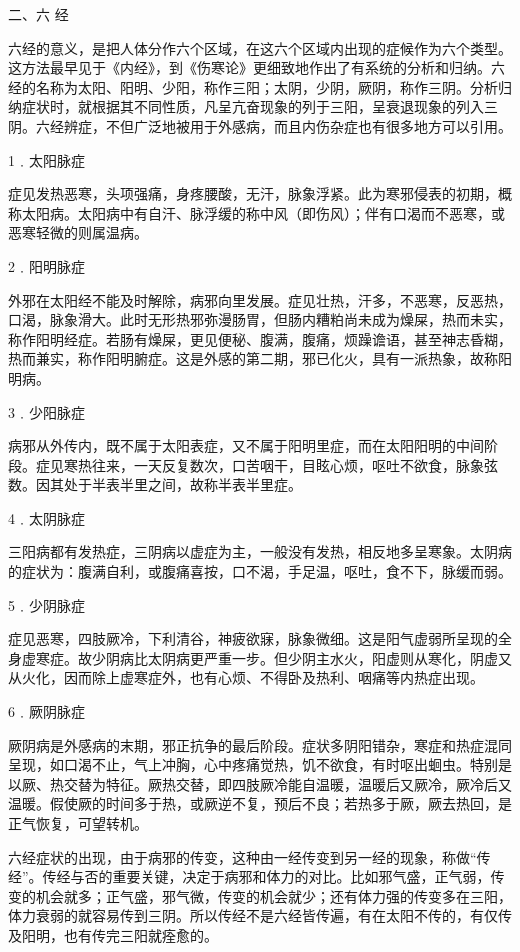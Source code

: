 \documentclass[12pt,UTF8]{ctexbook}
\begin{document}
二、六 经

六经的意义，是把人体分作六个区域，在这六个区域内出现的症候作为六个类型。这方法最早见于《内经》，到《伤寒论》更细致地作出了有系统的分析和归纳。六经的名称为太阳、阳明、少阳，称作三阳；太阴，少阴，厥阴，称作三阴。分析归纳症状时，就根据其不同性质，凡呈亢奋现象的列于三阳，呈衰退现象的列入三阴。六经辨症，不但广泛地被用于外感病，而且内伤杂症也有很多地方可以引用。

1﹒太阳脉症

症见发热恶寒，头项强痛，身疼腰酸，无汗，脉象浮紧。此为寒邪侵表的初期，概称太阳病。太阳病中有自汗、脉浮缓的称中风（即伤风）；伴有口渴而不恶寒，或恶寒轻微的则属温病。

2﹒阳明脉症

外邪在太阳经不能及时解除，病邪向里发展。症见壮热，汗多，不恶寒，反恶热，口渴，脉象滑大。此时无形热邪弥漫肠胃，但肠内糟粕尚未成为燥屎，热而未实，称作阳明经症。若肠有燥屎，更见便秘、腹满，腹痛，烦躁谵语，甚至神志昏糊，热而兼实，称作阳明腑症。这是外感的第二期，邪已化火，具有一派热象，故称阳明病。

3﹒少阳脉症

病邪从外传内，既不属于太阳表症，又不属于阳明里症，而在太阳阳明的中间阶段。症见寒热往来，一天反复数次，口苦咽干，目眩心烦，呕吐不欲食，脉象弦数。因其处于半表半里之间，故称半表半里症。

4﹒太阴脉症

三阳病都有发热症，三阴病以虚症为主，一般没有发热，相反地多呈寒象。太阴病的症状为：腹满自利，或腹痛喜按，口不渴，手足温，呕吐，食不下，脉缓而弱。

5﹒少阴脉症

症见恶寒，四肢厥冷，下利清谷，神疲欲寐，脉象微细。这是阳气虚弱所呈现的全身虚寒症。故少阴病比太阴病更严重一步。但少阴主水火，阳虚则从寒化，阴虚又从火化，因而除上虚寒症外，也有心烦、不得卧及热利、咽痛等内热症出现。

6﹒厥阴脉症

厥阴病是外感病的末期，邪正抗争的最后阶段。症状多阴阳错杂，寒症和热症混同呈现，如口渴不止，气上冲胸，心中疼痛觉热，饥不欲食，有时呕出蛔虫。特别是以厥、热交替为特征。厥热交替，即四肢厥冷能自温暖，温暖后又厥冷，厥冷后又温暖。假使厥的时间多于热，或厥逆不复，预后不良；若热多于厥，厥去热回，是正气恢复，可望转机。

六经症状的出现，由于病邪的传变，这种由一经传变到另一经的现象，称做“传经”。传经与否的重要关键，决定于病邪和体力的对比。比如邪气盛，正气弱，传变的机会就多；正气盛，邪气微，传变的机会就少；还有体力强的传变多在三阳，体力衰弱的就容易传到三阴。所以传经不是六经皆传遍，有在太阳不传的，有仅传及阳明，也有传完三阳就痊愈的。
\end{document}
